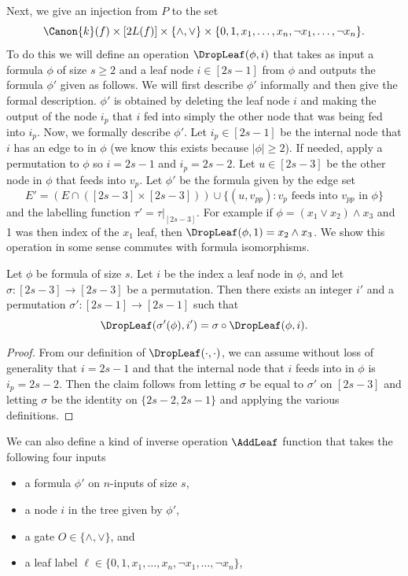 Next, we give an injection from $P$ to the set
\[\Canon{k}(f)\times[2L(f)]\times\{\land,\lor\}\times\{0,1,x_1,\ldots,x_n,\neg x_1,\ldots,\neg x_n\}.\]
To do this we will define an operation $\DropLeaf(\phi,i)$ that takes as input a formula $\phi$ of size $s\geq 2$ and a leaf node $i\in[2s-1]$ from $\phi$ and outputs the formula $\phi'$ given as follows. We will first describe $\phi'$ informally and then give the formal description. $\phi'$ is obtained by deleting the leaf node $i$ and making the output of the node $i_p$ that $i$ fed into simply the other node that was being fed into $i_p$.
Now, we formally describe $\phi'$. Let $i_p\in[2s-1]$ be the internal node that $i$ has an edge to in $\phi$ (we know this exists because $|\phi|\geq 2$). If needed, apply a permutation to $\phi$ so $i=2s-1$ and $i_p=2s-2$. Let $u\in[2s-3]$ be the other node in $\phi$ that feeds into $v_p$. Let $\phi'$ be the formula given by the edge set
\[E'=(E\cap([2s-3]\times[2s-3]))\cup\{(u,v_{pp}):v_p\text{ feeds into }v_{pp}\text{ in }\phi\}\]
and the labelling function $\tau'=\tau|_{[2s-3]}$.
For example if $\phi=(x_1\lor x_2)\land x_3$ and 1 was then index of the $x_1$ leaf, then $\DropLeaf(\phi,1)=x_2\land x_3$.
We show this operation in some sense commutes with formula isomorphisms.
\begin{ntclaim}
Let $\phi$ be formula of size $s$. Let $i$ be the index a leaf node in $\phi$, and let $\sigma:[2s-3]\to[2s-3]$ be a permutation. Then there exists an integer $i'$ and a permutation $\sigma':[2s-1]\to[2s-1]$ such that
\[\DropLeaf(\sigma'(\phi),i')=\sigma\circ\DropLeaf(\phi,i).\]
\end{ntclaim}
\begin{proof}
From our definition of $\DropLeaf(\cdot,\cdot)$, we can assume without loss of generality that $i=2s-1$ and that the internal node that $i$ feeds into in $\phi$ is $i_p=2s-2$.
Then the claim follows from letting $\sigma$ be equal to $\sigma'$ on $[2s-3]$ and letting $\sigma$ be the identity on $\{2s-2,2s-1\}$ and applying the various definitions.
\end{proof}
We can also define a kind of inverse operation $\AddLeaf$ function that takes the following four inputs
\begin{itemize}
\item a formula $\phi'$ on $n$-inputs of size $s$,
\item a node $i$ in the tree given by $\phi'$,
\item a gate $O\in\{\land,\lor\}$, and
\item a leaf label $\ell\in\{0,1,x_1,\ldots,x_n,\neg x_1,\ldots,\neg x_n\}$,
\end{itemize}
